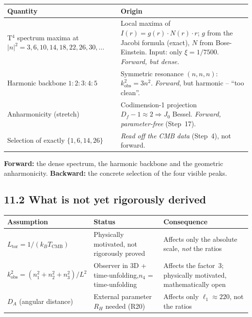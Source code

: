 \begin{center}
\begin{tabular}{p{4cm}p{8cm}}
\toprule
\textbf{Quantity} & \textbf{Origin} \\
\midrule
T$^4$ spectrum maxima at \newline $|n|^2 = 3,6,10,14,18,22,26,30,\ldots$ &
  Local maxima of $I(r) = g(r)\cdot N(r)\cdot r$;
  $g$ from the Jacobi formula (exact), $N$ from Bose-Einstein.
  Input: only $\xi = 1/7500$. \emph{Forward, but dense.} \\
\addlinespace
Harmonic backbone $1:2:3:4:5$ &
  Symmetric resonance $(n,n,n)$: $k^2_\mathrm{obs}=3n^2$.
  \emph{Forward}, but harmonic -- ``too clean''. \\
\addlinespace
Anharmonicity (stretch) &
  Codimension-1 projection $D_f-1\approx2 \Rightarrow J_0$ Bessel.
  \emph{Forward, parameter-free} (Step~17). \\
\addlinespace
Selection of exactly $\{1,6,14,26\}$ &
  \emph{Read off the CMB data} (Step~4), not forward. \\
\bottomrule
\end{tabular}
\end{center}

\textbf{Forward:} the dense spectrum, the harmonic backbone and the geometric
anharmonicity. \textbf{Backward:} the concrete selection of the four visible
peaks.

\subsection*{11.2 What is not yet rigorously derived}

\begin{center}
\begin{tabular}{p{4cm}p{4cm}p{4cm}}
\toprule
\textbf{Assumption} & \textbf{Status} & \textbf{Consequence} \\
\midrule
$L_\mathrm{tor} = 1/(k_BT_\mathrm{CMB})$ &
  Physically motivated, not rigorously proved &
  Affects only the absolute scale, \emph{not} the ratios \\
\addlinespace
$k_\mathrm{obs}^2 = (n_1^2+n_2^2+n_3^2)/L^2$ &
  Observer in 3D + time-unfolding,\newline $n_4$ = time-unfolding &
  Affects the factor~3; physically motivated, mathematically open \\
\addlinespace
$D_A$ (angular distance) &
  External parameter $R_H$ needed (R20) &
  Affects only $\ell_1 \approx 220$, not the ratios \\
\bottomrule
\end{tabular}
\end{center}

